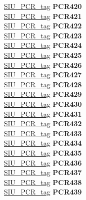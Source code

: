 \begin{DoxyCompactItemize}
\begin{tabbing}
\>\>\mbox{\hyperlink{unionSIU__tag_1_1SIU__PCR__tag}{SIU\_PCR\_tag}} {\bfseries PCR420}\\
\>\>\mbox{\hyperlink{unionSIU__tag_1_1SIU__PCR__tag}{SIU\_PCR\_tag}} {\bfseries PCR421}\\
\>\>\mbox{\hyperlink{unionSIU__tag_1_1SIU__PCR__tag}{SIU\_PCR\_tag}} {\bfseries PCR422}\\
\>\>\mbox{\hyperlink{unionSIU__tag_1_1SIU__PCR__tag}{SIU\_PCR\_tag}} {\bfseries PCR423}\\
\>\>\mbox{\hyperlink{unionSIU__tag_1_1SIU__PCR__tag}{SIU\_PCR\_tag}} {\bfseries PCR424}\\
\>\>\mbox{\hyperlink{unionSIU__tag_1_1SIU__PCR__tag}{SIU\_PCR\_tag}} {\bfseries PCR425}\\
\>\>\mbox{\hyperlink{unionSIU__tag_1_1SIU__PCR__tag}{SIU\_PCR\_tag}} {\bfseries PCR426}\\
\>\>\mbox{\hyperlink{unionSIU__tag_1_1SIU__PCR__tag}{SIU\_PCR\_tag}} {\bfseries PCR427}\\
\>\>\mbox{\hyperlink{unionSIU__tag_1_1SIU__PCR__tag}{SIU\_PCR\_tag}} {\bfseries PCR428}\\
\>\>\mbox{\hyperlink{unionSIU__tag_1_1SIU__PCR__tag}{SIU\_PCR\_tag}} {\bfseries PCR429}\\
\>\>\mbox{\hyperlink{unionSIU__tag_1_1SIU__PCR__tag}{SIU\_PCR\_tag}} {\bfseries PCR430}\\
\>\>\mbox{\hyperlink{unionSIU__tag_1_1SIU__PCR__tag}{SIU\_PCR\_tag}} {\bfseries PCR431}\\
\>\>\mbox{\hyperlink{unionSIU__tag_1_1SIU__PCR__tag}{SIU\_PCR\_tag}} {\bfseries PCR432}\\
\>\>\mbox{\hyperlink{unionSIU__tag_1_1SIU__PCR__tag}{SIU\_PCR\_tag}} {\bfseries PCR433}\\
\>\>\mbox{\hyperlink{unionSIU__tag_1_1SIU__PCR__tag}{SIU\_PCR\_tag}} {\bfseries PCR434}\\
\>\>\mbox{\hyperlink{unionSIU__tag_1_1SIU__PCR__tag}{SIU\_PCR\_tag}} {\bfseries PCR435}\\
\>\>\mbox{\hyperlink{unionSIU__tag_1_1SIU__PCR__tag}{SIU\_PCR\_tag}} {\bfseries PCR436}\\
\>\>\mbox{\hyperlink{unionSIU__tag_1_1SIU__PCR__tag}{SIU\_PCR\_tag}} {\bfseries PCR437}\\
\>\>\mbox{\hyperlink{unionSIU__tag_1_1SIU__PCR__tag}{SIU\_PCR\_tag}} {\bfseries PCR438}\\
\>\>\mbox{\hyperlink{unionSIU__tag_1_1SIU__PCR__tag}{SIU\_PCR\_tag}} {\bfseries PCR439}\\

\end{tabbing}
\end{DoxyCompactItemize}
